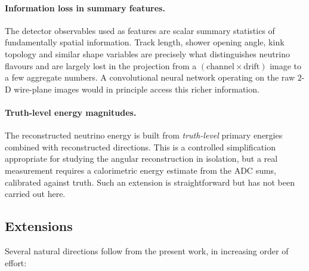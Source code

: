 \documentclass[11pt,a4paper]{article}
\begin{document}
\paragraph{Information loss in summary features.}
The detector observables used as features are scalar summary statistics of fundamentally spatial information.  Track length, shower opening angle, kink topology and similar shape variables are precisely what distinguishes neutrino flavours and are largely lost in the projection from a $(\text{channel}\times\text{drift})$ image to a few aggregate numbers.  A convolutional neural network operating on the raw $2$-D wire-plane images would in principle access this richer information.

\paragraph{Truth-level energy magnitudes.}
The reconstructed neutrino energy is built from \emph{truth-level} primary energies combined with reconstructed directions.  This is a controlled simplification appropriate for studying the angular reconstruction in isolation, but a real measurement requires a calorimetric energy estimate from the ADC sums, calibrated against truth.  Such an extension is straightforward but has not been carried out here.

\subsection{Extensions}
Several natural directions follow from the present work, in increasing order of effort:
\end{document}
